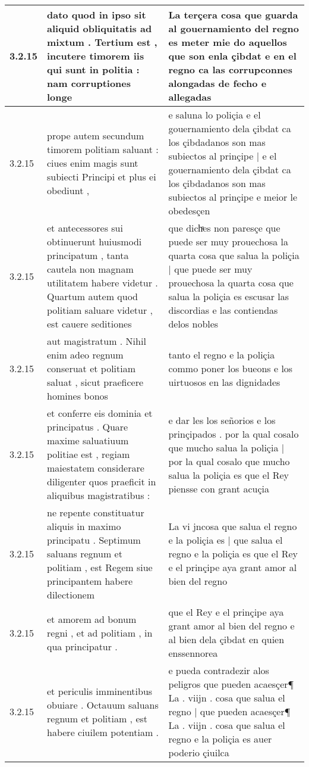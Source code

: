 \begin{tabular}{|p{1cm}|p{6.5cm}|p{6.5cm}|}
3.2.15 & dato quod in ipso sit aliquid obliquitatis ad mixtum . Tertium est , incutere timorem iis qui sunt in politia : nam corruptiones longe & La terçera cosa que guarda al gouernamiento del regno es meter mie do aquellos que son enla çibdat e en el regno ca las corrupconnes alongadas de fecho e allegadas \\\hline
3.2.15 & prope autem secundum timorem politiam saluant : ciues enim magis sunt subiecti Principi et plus ei obediunt , & e saluna lo poliçia e el gouernamiento dela çibdat ca los çibdadanos son mas subiectos al prinçipe | e el gouernamiento dela çibdat ca los çibdadanos son mas subiectos al prinçipe e meior le obedesçen \\\hline
3.2.15 & et antecessores sui obtinuerunt huiusmodi principatum , tanta cautela non magnam utilitatem habere videtur . Quartum autem quod politiam saluare videtur , est cauere seditiones & que dichͣes non paresçe que puede ser muy prouechosa la quarta cosa que salua la poliçia | que puede ser muy prouechosa la quarta cosa que salua la poliçia es escusar las discordias e las contiendas delos nobles \\\hline
3.2.15 & aut magistratum . Nihil enim adeo regnum conseruat et politiam saluat , sicut praeficere homines bonos & tanto el regno e la poliçia commo poner los bueons e los uirtuosos en las dignidades \\\hline
3.2.15 & et conferre eis dominia et principatus . Quare maxime saluatiuum politiae est , regiam maiestatem considerare diligenter quos praeficit in aliquibus magistratibus : & e dar les los señorios e los prinçipados . por la qual cosalo que mucho salua la poliçia | por la qual cosalo que mucho salua la poliçia es que el Rey piensse con grant acuçia \\\hline
3.2.15 & ne repente constituatur aliquis in maximo principatu . Septimum saluans regnum et politiam , est Regem siue principantem habere dilectionem & La vi jncosa que salua el regno e la poliçia es | que salua el regno e la poliçia es que el Rey e el prinçipe aya grant amor al bien del regno \\\hline
3.2.15 & et amorem ad bonum regni , et ad politiam , in qua principatur . & que el Rey e el prinçipe aya grant amor al bien del regno e al bien dela çibdat en quien enssennorea \\\hline
3.2.15 & et periculis imminentibus obuiare . Octauum saluans regnum et politiam , est habere ciuilem potentiam . & e pueda contradezir alos peligros que pueden acaesçer¶ La . viijn . cosa que salua el regno | que pueden acaesçer¶ La . viijn . cosa que salua el regno e la poliçia es auer poderio çiuilca \\\hline

\end{tabular}
